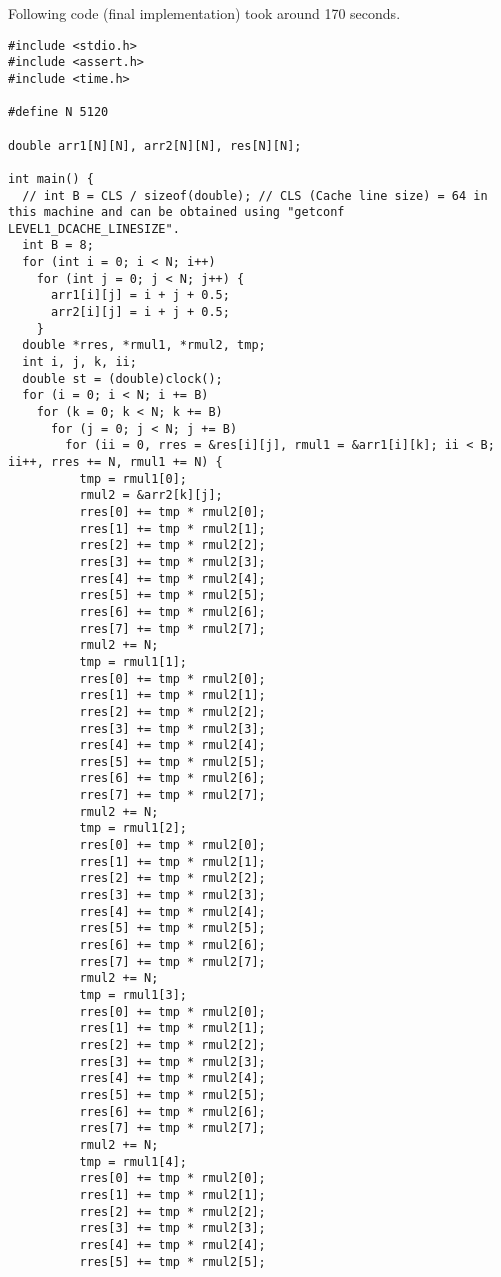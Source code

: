 \documentclass[12pt,3p]{elsarticle}
\begin{document}
Following code (final implementation) took around 170 seconds.

\begin{verbatim}
#include <stdio.h>
#include <assert.h>
#include <time.h>

#define N 5120

double arr1[N][N], arr2[N][N], res[N][N];

int main() {
  // int B = CLS / sizeof(double); // CLS (Cache line size) = 64 in this machine and can be obtained using "getconf LEVEL1_DCACHE_LINESIZE".
  int B = 8;
  for (int i = 0; i < N; i++)
    for (int j = 0; j < N; j++) {
      arr1[i][j] = i + j + 0.5;
      arr2[i][j] = i + j + 0.5;
    }
  double *rres, *rmul1, *rmul2, tmp;
  int i, j, k, ii;
  double st = (double)clock();
  for (i = 0; i < N; i += B)
    for (k = 0; k < N; k += B)
      for (j = 0; j < N; j += B)
        for (ii = 0, rres = &res[i][j], rmul1 = &arr1[i][k]; ii < B; ii++, rres += N, rmul1 += N) {
          tmp = rmul1[0];
          rmul2 = &arr2[k][j];
          rres[0] += tmp * rmul2[0];
          rres[1] += tmp * rmul2[1];
          rres[2] += tmp * rmul2[2];
          rres[3] += tmp * rmul2[3];
          rres[4] += tmp * rmul2[4];
          rres[5] += tmp * rmul2[5];
          rres[6] += tmp * rmul2[6];
          rres[7] += tmp * rmul2[7];
          rmul2 += N;
          tmp = rmul1[1];
          rres[0] += tmp * rmul2[0];
          rres[1] += tmp * rmul2[1];
          rres[2] += tmp * rmul2[2];
          rres[3] += tmp * rmul2[3];
          rres[4] += tmp * rmul2[4];
          rres[5] += tmp * rmul2[5];
          rres[6] += tmp * rmul2[6];
          rres[7] += tmp * rmul2[7];
          rmul2 += N;
          tmp = rmul1[2];
          rres[0] += tmp * rmul2[0];
          rres[1] += tmp * rmul2[1];
          rres[2] += tmp * rmul2[2];
          rres[3] += tmp * rmul2[3];
          rres[4] += tmp * rmul2[4];
          rres[5] += tmp * rmul2[5];
          rres[6] += tmp * rmul2[6];
          rres[7] += tmp * rmul2[7];
          rmul2 += N;
          tmp = rmul1[3];
          rres[0] += tmp * rmul2[0];
          rres[1] += tmp * rmul2[1];
          rres[2] += tmp * rmul2[2];
          rres[3] += tmp * rmul2[3];
          rres[4] += tmp * rmul2[4];
          rres[5] += tmp * rmul2[5];
          rres[6] += tmp * rmul2[6];
          rres[7] += tmp * rmul2[7];
          rmul2 += N;
          tmp = rmul1[4];
          rres[0] += tmp * rmul2[0];
          rres[1] += tmp * rmul2[1];
          rres[2] += tmp * rmul2[2];
          rres[3] += tmp * rmul2[3];
          rres[4] += tmp * rmul2[4];
          rres[5] += tmp * rmul2[5];

\end{verbatim}
\end{document}
